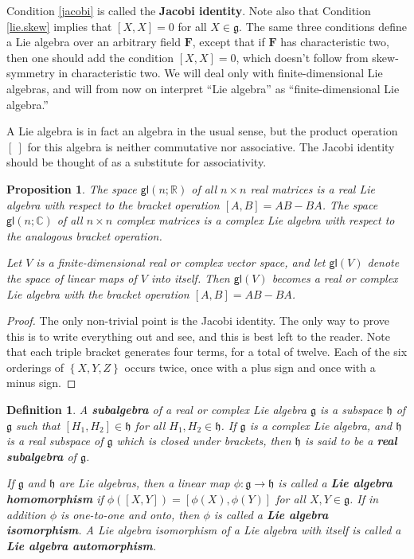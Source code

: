 \documentclass[12pt]{amsbook}
\let \frak = \mathfrak
\theoremstyle{plain}
\newtheorem{definition}[theorem]{Definition}
\newtheorem{proposition}[theorem]{Proposition}
\numberwithin{equation}{chapter}
\numberwithin{theorem}{chapter}
\begin{document}
Condition \ref{jacobi} is called the \textbf{Jacobi identity}. Note also that
Condition \ref{lie.skew} implies that $\left[  X,X\right]  =0$ for all
$X\in\frak{g}$. The same three conditions define a Lie algebra over an
arbitrary field $\mathbf{F}$, except that if $\mathbf{F}$ has characteristic
two, then one should add the condition $\left[  X,X\right]  =0$, which doesn't
follow from skew-symmetry in characteristic two. We will deal only with
finite-dimensional Lie algebras, and will from now on interpret ``Lie
algebra'' as ``finite-dimensional Lie algebra.''

A Lie algebra is in fact an algebra in the usual sense, but the product
operation $\left[  \ \right]  $ for this algebra is neither commutative nor
associative. The Jacobi identity should be thought of as a substitute for associativity.

\begin{proposition}
The space $\mathsf{gl}(n;\mathbb{R})$ of all $n\times n$ real matrices is a
real Lie algebra with respect to the bracket operation $\left[  A,B\right]
=AB-BA$. The space $\mathsf{gl}(n;\mathbb{C})$ of all $n\times n$ complex
matrices is a complex Lie algebra with respect to the analogous bracket operation.

Let $V$ is a finite-dimensional real or complex vector space, and let
$\mathsf{gl}(V)$ denote the space of linear maps of $V$ into itself. Then
$\mathsf{gl}(V)$ becomes a real or complex Lie algebra with the bracket
operation $\left[  A,B\right]  =AB-BA$.
\end{proposition}

\begin{proof}
The only non-trivial point is the Jacobi identity. The only way to prove this
is to write everything out and see, and this is best left to the reader. Note
that each triple bracket generates four terms, for a total of twelve. Each of
the six orderings of $\left\{  X,Y,Z\right\}  $ occurs twice, once with a plus
sign and once with a minus sign.
\end{proof}

\begin{definition}
A \textbf{subalgebra} of a real or complex Lie algebra $\frak{g}$ is a
subspace $\frak{h}$ of $\frak{g}$ such that $\left[  H_{1},H_{2}\right]
\in\frak{h}$ for all $H_{1},H_{2}\in\frak{h}$. If $\frak{g}$ is a complex Lie
algebra, and $\frak{h}$ is a real subspace of $\frak{g}$ which is closed under
brackets, then $\frak{h}$ is said to be a \textbf{real subalgebra} of
$\frak{g}$.

If $\frak{g}$ and $\frak{h}$ are Lie algebras, then a linear map
$\phi:\frak{g}\rightarrow\frak{h}$ is called a \textbf{Lie algebra
homomorphism} if $\phi\left(  \left[  X,Y\right]  \right)  =\left[
\phi(X),\phi(Y)\right]  $ for all $X,Y\in\frak{g}$. If in addition $\phi$ is
one-to-one and onto, then $\phi$ is called a \textbf{Lie algebra isomorphism}.
A Lie algebra isomorphism of a Lie algebra with itself is called a \textbf{Lie
algebra automorphism}.
\end{definition}
\end{document}
